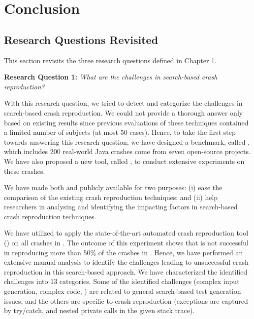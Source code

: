 \chapter{Conclusion}
\label{conclusion}

\section{Research Questions Revisited}

This section revisits the three research questions defined in Chapter 1.


\textbf{Research Question 1: }\textit{What are the challenges in search-based crash reproduction?}

With this research question, we tried to detect and categorize the challenges in search-based crash reproduction. 
We could not provide a thorough answer only based on existing results since previous evaluations of these techniques contained a limited number of subjects (at most 50 cases). Hence, to take the first step towards answering this research question, we have designed a benchmark, called \crashpack, which includes 200 real-world Java crashes come from seven open-source projects. We have also proposed a new tool, called \exrunner, to conduct extensive experiments on these crashes.

We have made both \crashpack and \exrunner publicly available for two purposes: 
(i) ease the comparison of the existing crash reproduction techniques; and 
(ii) help researchers in analysing and identifying the impacting factors in search-based crash reproduction techniques.

We have utilized \exrunner to apply the state-of-the-art automated crash reproduction tool (\evocrash) on all crashes in \jcrashpack. The outcome of this experiment shows that \evocrash is not successful in reproducing more than 50\% of the crashes in \jcrashpack. Hence, we have performed an extensive manual analysis to identify the challenges leading to unsuccessful crash reproduction in this search-based approach. We have characterized the identified challenges into 13 categories. Some of the identified challenges (\eg complex input generation, complex code, \etc) are related to general search-based test generation issues, and the others are specific to crash reproduction (\eg exceptions are captured by try/catch, and nested private calls in the given stack trace).


